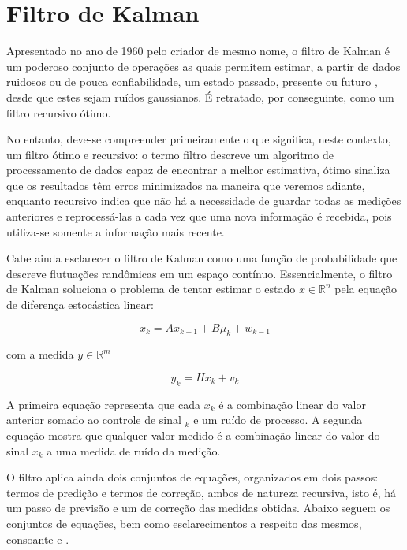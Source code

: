 \documentclass[conference]{IEEEtran}
\begin{document}
\section{Filtro de Kalman} \label{sec:kalmanfilter}
Apresentado no ano de 1960 pelo criador de mesmo nome, o filtro de Kalman é um poderoso conjunto de operações as quais permitem estimar, a partir de dados ruidosos ou de pouca confiabilidade, um estado passado, presente ou futuro \cite{WelchBishop}, desde que estes sejam ruídos gaussianos. É retratado, por conseguinte, como um filtro recursivo ótimo.

No entanto, deve-se compreender primeiramente o que significa, neste contexto, um filtro ótimo e recursivo: o termo filtro descreve um algoritmo de processamento de dados capaz de encontrar a melhor estimativa, ótimo sinaliza que os resultados têm erros minimizados na maneira que veremos adiante, enquanto recursivo indica que não há a necessidade de guardar todas as medições anteriores e reprocessá-las a cada vez que uma nova informação é recebida, pois utiliza-se somente a informação mais recente.

Cabe ainda esclarecer o filtro de Kalman como uma função de probabilidade que descreve flutuações randômicas em um espaço contínuo. Essencialmente, o filtro de Kalman soluciona o problema de tentar estimar o estado $  x \in \mathbb{R}^{n}$ pela equação de diferença estocástica linear:

\begin{equation}
x_k = Ax_{k-1} + B\mu_k + w_{k-1}
\end{equation}

com a medida $ y \in \mathbb{R}^{m}$

\begin{equation}
y_k = Hx_k + v_k
\end{equation}

A primeira equação representa que cada $x_k$ é a combinação linear do valor anterior somado ao controle de sinal $_k$ e um ruído de processo. A segunda equação mostra que qualquer valor medido é a combinação linear do valor do sinal $x_k$ a uma medida de ruído da medição.

O filtro aplica ainda dois conjuntos de equações, organizados em dois passos: termos de predição e termos de correção, ambos de natureza recursiva, isto é, há um passo de previsão e um de correção das medidas obtidas. Abaixo seguem os conjuntos de equações, bem como esclarecimentos a respeito das mesmos, consoante \cite{WelchBishop} e \cite{LAARAIEDH}.
\end{document}
